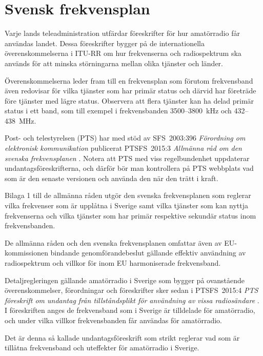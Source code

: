 \chapter{Svensk frekvensplan}
\label{svensk frekvensplan}

Varje lands teleadministration utfärdar föreskrifter för hur amatörradio får
användas landet.
Dessa föreskrifter bygger på de internationella överenskommelserna i ITU-RR
\cite[ARTICLE 5]{ITU-RR} om hur frekvenserna och radiospektrum ska används för att minska
störningarna mellan olika tjänster och länder.

Överenskommelserna leder fram till en frekvensplan som förutom frekvensband även
redovisar för vilka tjänster som har primär status och därvid har företräde före
tjänster med lägre status.
Observera att flera tjänster kan ha delad primär status i ett band, som till
exempel i frekvensbanden 3500--3800~kHz och 432--438~MHz.

Post- och telestyrelsen (PTS) har med stöd av SFS~2003:396
\emph{Förordning om elektronisk kommunikation} \cite{SFS2003:396}
publicerat PTSFS~2015:3 \emph{Allmänna råd om den svenska frekvensplanen}
\cite{PTSFS2015:3}.
Notera att PTS med viss regelbundenhet uppdaterar undantagsföreskrifterna,
och därför bör man kontrollera på PTS webbplats vad som är den senaste versionen
och använda den när den trätt i kraft.

Bilaga 1 till de allmänna råden utgör den svenska frekvensplanen som reglerar
vilka frekvenser som är upplåtna i Sverige samt vilka tjänster som kan nyttja
frekvenserna och vilka tjänster som har primär respektive sekundär status inom
frekvensbanden.

De allmänna råden och den svenska frekvensplanen omfattar även av
EU-kommissionen bindande genomförandebeslut gällande effektiv användning av
radiospektrum och villkor för inom EU harmoniserade frekvensband.

Detaljregleringen gällande amatörradio i Sverige som bygger på ovanstående
överenskommelser, förordningar och föreskrifter sker sedan i PTSFS~2015:4
\emph{PTS föreskrift om undantag från tillståndsplikt för användning av vissa
  radiosändare} \cite{PTSFS2015:4}.
I föreskriften anges de frekvensband som i Sverige är tilldelade för
amatörradio, och under vilka villkor frekvensbanden får användas för
amatörradio.

Det är denna så kallade undantagsföreskrift som strikt reglerar vad som är
tillåtna frekvensband och uteffekter för amatörradio i Sverige.

